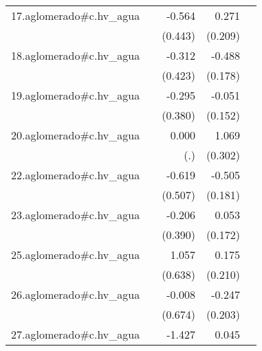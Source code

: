 {\begin{longtable}{l*{4}{D{.}{.}{-1}}}
\addlinespace
17.aglomerado#c.hv\_agua&                     &      -0.564         &       0.271         &                     \\
            &                     &     (0.443)         &     (0.209)         &                     \\
\addlinespace
18.aglomerado#c.hv\_agua&                     &      -0.312         &      -0.488\sym{**} &                     \\
            &                     &     (0.423)         &     (0.178)         &                     \\
\addlinespace
19.aglomerado#c.hv\_agua&                     &      -0.295         &      -0.051         &                     \\
            &                     &     (0.380)         &     (0.152)         &                     \\
\addlinespace
20.aglomerado#c.hv\_agua&                     &       0.000         &       1.069\sym{***}&                     \\
            &                     &         (.)         &     (0.302)         &                     \\
\addlinespace
22.aglomerado#c.hv\_agua&                     &      -0.619         &      -0.505\sym{**} &                     \\
            &                     &     (0.507)         &     (0.181)         &                     \\
\addlinespace
23.aglomerado#c.hv\_agua&                     &      -0.206         &       0.053         &                     \\
            &                     &     (0.390)         &     (0.172)         &                     \\
\addlinespace
25.aglomerado#c.hv\_agua&                     &       1.057         &       0.175         &                     \\
            &                     &     (0.638)         &     (0.210)         &                     \\
\addlinespace
26.aglomerado#c.hv\_agua&                     &      -0.008         &      -0.247         &                     \\
            &                     &     (0.674)         &     (0.203)         &                     \\
\addlinespace
27.aglomerado#c.hv\_agua&                     &      -1.427\sym{*}  &       0.045         &                     \\

\end{longtable}}
